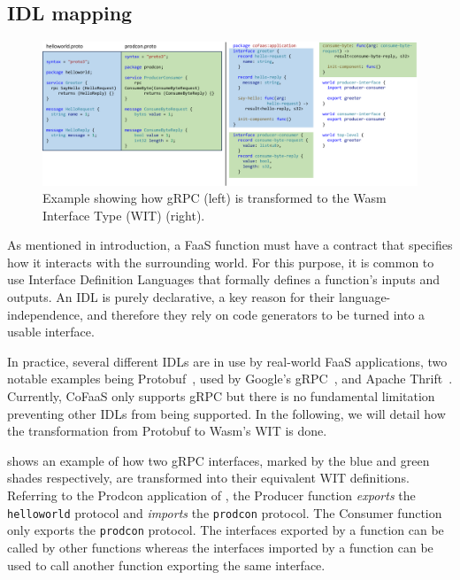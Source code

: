 


\subsection{IDL mapping}
\label{es:subsec:idl-mapping}

\begin{figure}
  \centering
  \includegraphics[width=\textwidth]{figures/idf_transformation}
  \caption{\label{es:fig:wit-transformation} Example showing how gRPC (left) is transformed to the Wasm Interface Type (WIT) (right).}
\end{figure}

As mentioned in introduction, a FaaS function must have a contract that specifies how it interacts with the surrounding world. For this purpose, it is common to use Interface Definition Languages that formally defines a function's inputs and outputs. An IDL is purely declarative, a key reason for their language-independence, and therefore they rely on code generators to be turned into a usable interface.

In practice, several different IDLs are in use by real-world FaaS applications, two notable examples being Protobuf~\cite{protobuf}, used by Google's gRPC~\cite{grpc}, and Apache Thrift~\cite{thrift}. Currently, CoFaaS only supports gRPC but there is no fundamental limitation preventing other IDLs from being supported. In the following, we will detail how the transformation from Protobuf to Wasm's WIT is done.

 shows an example of how two gRPC interfaces, marked by the blue and green shades respectively, are transformed into their equivalent WIT definitions. Referring to the Prodcon application of , the Producer function \emph{exports} the \texttt{helloworld} protocol and \emph{imports} the \texttt{prodcon} protocol. The Consumer function only exports the \texttt{prodcon} protocol. The interfaces exported by a function can be called by other functions whereas the interfaces imported by a function can be used to call another function exporting the same interface.

